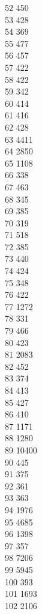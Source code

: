 { 52	450 \\
 53	428 \\
 54	369 \\
 55	477 \\
 56	457 \\
 57	422 \\
 58	422 \\
 59	342 \\
 60	414 \\
 61	416 \\
 62	428 \\
 63	4411 \\
 64	2850 \\
 65	1108 \\
 66	338 \\
 67	463 \\
 68	345 \\
 69	385 \\
 70	319 \\
 71	518 \\
 72	385 \\
 73	440 \\
 74	424 \\
 75	348 \\
 76	422 \\
 77	1272 \\
 78	331 \\
 79	466 \\
 80	423 \\
 81	2083 \\
 82	452 \\
 83	374 \\
 84	413 \\
 85	427 \\
 86	410 \\
 87	1171 \\
 88	1280 \\
 89	10400 \\
 90	445 \\
 91	375 \\
 92	361 \\
 93	363 \\
 94	1976 \\
 95	4685 \\
 96	1398 \\
 97	357 \\
 98	7206 \\
 99	5945 \\
 100	393 \\
 101	1693 \\
 102	2106 \\
}

